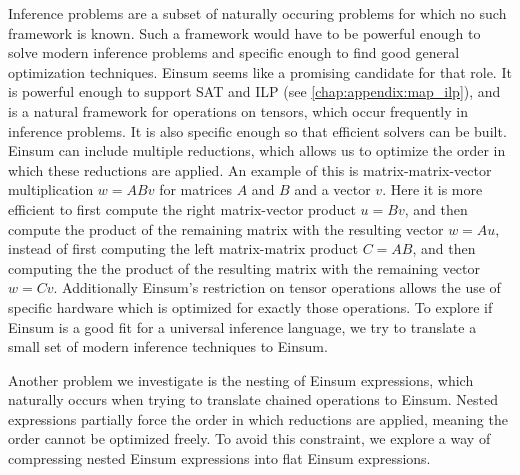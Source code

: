 Inference problems are a subset of naturally occuring problems for which no such framework is known.
Such a framework would have to be powerful enough to solve modern inference problems and specific enough to find good general optimization techniques.
Einsum seems like a promising candidate for that role.
It is powerful enough to support SAT \cite{Biamonte2014} and ILP (see \cref{chap:appendix:map_ilp}), and is a natural framework for operations on tensors, which occur frequently in inference problems.
It is also specific enough so that efficient solvers can be built.
Einsum can include multiple reductions, which allows us to optimize the order in which these reductions are applied.
An example of this is matrix-matrix-vector multiplication $w = A B v$ for matrices $A$ and $B$ and a vector $v$.
Here it is more efficient to first compute the right matrix-vector product $u = Bv$, and then compute the product of the remaining matrix with the resulting vector $w = Au$,
instead of first computing the left matrix-matrix product $C = AB$, and then computing the the product of the resulting matrix with the remaining vector $w = Cv$.
Additionally Einsum's restriction on tensor operations allows the use of specific hardware which is optimized for exactly those operations.
To explore if Einsum is a good fit for a universal inference language,
we try to translate a small set of modern inference techniques to Einsum.

Another problem we investigate is the nesting of Einsum expressions, which naturally occurs when trying to translate chained operations to Einsum.
Nested expressions partially force the order in which reductions are applied, meaning the order cannot be optimized freely.
To avoid this constraint, we explore a way of compressing nested Einsum expressions into flat Einsum expressions.